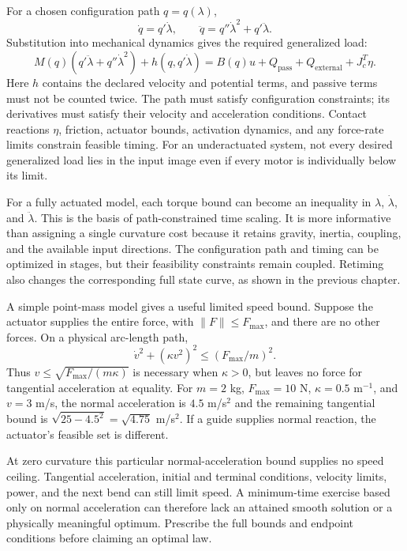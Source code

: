 For a chosen configuration path $q=q(\lambda)$,
\begin{equation}
 \dot q=q'\dot\lambda,\qquad
 \ddot q=q''\dot\lambda^2+q'\ddot\lambda.
\end{equation}
Substitution into mechanical dynamics gives the required generalized load:
\begin{equation}\label{eq:curve_path_dynamics}
 M(q)(q'\ddot\lambda+q''\dot\lambda^2)+h(q,q'\dot\lambda)
 =B(q)u+Q_{\mathrm{pass}}+Q_{\mathrm{external}}+J_c^T\eta.
\end{equation}
Here $h$ contains the declared velocity and potential terms, and passive
terms must not be counted twice. The path must satisfy configuration
constraints; its derivatives must satisfy their velocity and acceleration
conditions. Contact reactions $\eta$, friction, actuator bounds, activation
dynamics, and any force-rate limits constrain feasible timing. For an
underactuated system, not every desired generalized load lies in the input
image even if every motor is individually below its limit.

For a fully actuated model, each torque bound can become an inequality in
$\lambda$, $\dot\lambda$, and $\ddot\lambda$. This is the basis of
path-constrained time scaling. It is more informative than assigning a
single curvature cost because it retains gravity, inertia, coupling, and
the available input directions. The configuration path and timing can be
optimized in stages, but their feasibility constraints remain coupled.
Retiming also changes the corresponding full state curve, as shown in the
previous chapter.

A simple point-mass model gives a useful limited speed bound. Suppose the
actuator supplies the entire force, with $\|F\|\le F_{\max}$, and there are
no other forces. On a physical arc-length path,
\begin{equation}
 \dot v^2+(\kappa v^2)^2\le(F_{\max}/m)^2.
\end{equation}
Thus $v\le\sqrt{F_{\max}/(m\kappa)}$ is necessary when $\kappa>0$, but leaves
no force for tangential acceleration at equality. For $m=2$ kg,
$F_{\max}=10$ N, $\kappa=0.5$ m$^{-1}$, and $v=3$ m/s, the normal
acceleration is $4.5$ m/s$^2$ and the remaining tangential bound is
$\sqrt{25-4.5^2}=\sqrt{4.75}$ m/s$^2$. If a guide supplies normal reaction,
the actuator's feasible set is different.

At zero curvature this particular normal-acceleration bound supplies no
speed ceiling. Tangential acceleration, initial and terminal conditions,
velocity limits, power, and the next bend can still limit speed. A
minimum-time exercise based only on normal acceleration can therefore lack
an attained smooth solution or a physically meaningful optimum. Prescribe
the full bounds and endpoint conditions before claiming an optimal law.

